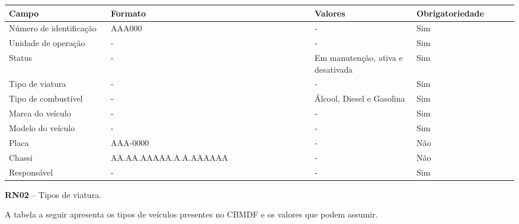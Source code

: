    \begin{table*}[!h]
    \centering
      \begin{tabular}{|p{0.20\linewidth}|p{0.4\linewidth}|p{0.20\linewidth}|p{0.20\linewidth}|}
      \hline
      Campo  & Formato & Valores & Obrigatoriedade\\
      \hline

        Número de identificação & AAA000 & - & Sim\\

  \hline                               
  Unidade de operação & - & - & Sim\\

  \hline                               
  Status & - & Em manutenção, ativa e desativada & Sim\\
  
  \hline                               
  Tipo de viatura & - & - & Sim\\
  
  \hline                               
  Tipo de combustível & - & Álcool, Diesel e Gasolina & Sim\\
  
  \hline                               
  Marca do veículo & - & - & Sim\\
  
  \hline                               
  Modelo do veículo & - & - & Sim\\
  
  \hline                               
  Placa & AAA-0000 & - & Não\\
  
  \hline                               
  Chassi & AA.AA.AAAAA.A.A.AAAAAA & - & Não\\
  
  \hline                               
  Responsável & - & - & Sim\\  
  
  \hline  
      
      \end{tabular}
    \end{table*}

    
  \textbf{RN02} – Tipos de viatura.
   
 A tabela a seguir apresenta os tipos de veículos presentes no CBMDF e os valores que podem assumir.
 
